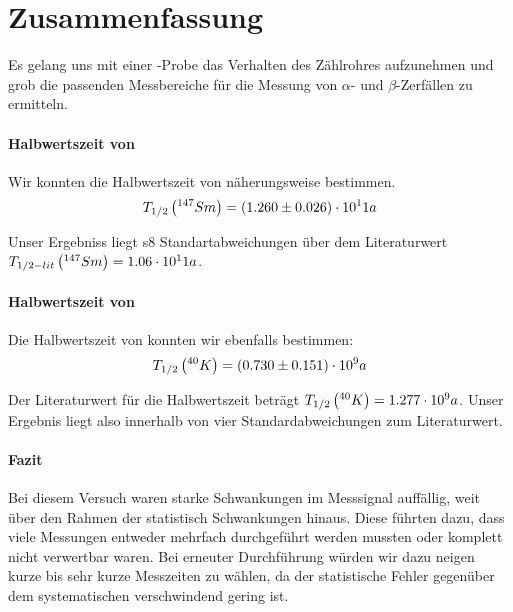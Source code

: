 \section{Zusammenfassung}

Es gelang uns mit einer -Probe das Verhalten des Zählrohres aufzunehmen und grob die passenden Messbereiche für die Messung von $\alpha$- und $\beta$-Zerfällen zu ermitteln. 

\paragraph{Halbwertszeit von } Wir konnten die Halbwertszeit von  näherungsweise bestimmen.
$$
 T_{1/2} \left( ^{147}_{}{Sm} \right) = (1.260 \pm 0.026) \cdot 10^11 a
$$

Unser Ergebniss liegt s8 Standartabweichungen über dem Literaturwert $T_{1/2 - lit} \left( ^{147}_{}{Sm} \right) = 1.06 \cdot 10^11 a$.

\paragraph{Halbwertszeit von } Die Halbwertszeit von  konnten wir ebenfalls bestimmen:
$$
  T_{1/2} \left( ^{40}_{}{K} \right) = ( 0.730 \pm 0.151 ) \cdot 10^9 a
$$

Der Literaturwert für die Halbwertszeit beträgt $T_{1/2} \left( ^{40}_{}{K} \right) = 1.277 \cdot 10^9 a$. Unser Ergebnis liegt also innerhalb von vier Standardabweichungen zum Literaturwert.

\paragraph{Fazit} Bei diesem Versuch waren starke Schwankungen im Messsignal auffällig, weit über den Rahmen der statistisch Schwankungen hinaus. Diese führten dazu, dass viele Messungen entweder mehrfach durchgeführt werden mussten oder komplett nicht verwertbar waren. Bei erneuter Durchführung würden wir dazu neigen kurze bis sehr kurze Messzeiten zu wählen, da der statistische Fehler gegenüber dem systematischen verschwindend gering ist.

